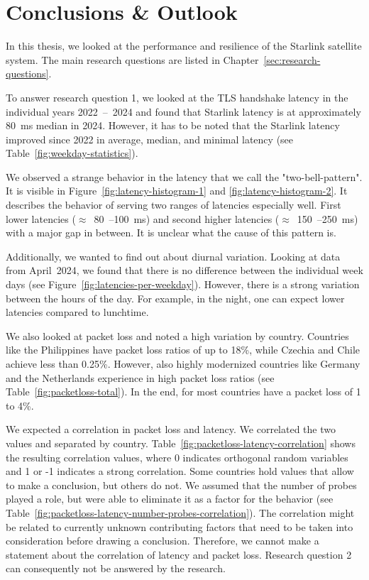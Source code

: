 \chapter{Conclusions \& Outlook} \label{sec:conclusion}

In this thesis, we looked at the performance and resilience of the Starlink
satellite system. The main research questions are listed in
Chapter~\ref{sec:research-questions}.

To answer research question 1, we looked at the TLS handshake latency in the
individual years 2022~--~2024 and found that Starlink latency is at
approximately 80~ms median in 2024. However, it has to be noted that the
Starlink latency improved since 2022 in average, median, and minimal latency
(see Table~\ref{fig:weekday-statistics}).

We observed a strange behavior in the latency that we call the
"two-bell-pattern". It is visible in Figure~\ref{fig:latency-histogram-1} and
\ref{fig:latency-histogram-2}. It describes the behavior of serving two ranges
of latencies especially well. First lower latencies ($\approx$~80~--100~ms) and
second higher latencies ($\approx$~150~--250~ms) with a major gap in between.
It is unclear what the cause of this pattern is.

Additionally, we wanted to find out about diurnal variation. Looking at data
from April~2024, we found that there is no difference between the individual
week days (see Figure~\ref{fig:latencies-per-weekday}). However, there is a
strong variation between the hours of the day. For example, in the night, one
can expect lower latencies compared to lunchtime.

We also looked at packet loss and noted a high variation by country. Countries
like the Philippines have packet loss ratios of up to 18\%, while Czechia and
Chile achieve less than 0.25\%. However, also highly modernized countries like
Germany and the Netherlands experience in high packet loss ratios (see
Table~\ref{fig:packetloss-total}). In the end, for most countries have a packet
loss of 1 to 4\%.

We expected a correlation in packet loss and latency. We correlated the two
values and separated by country. Table~\ref{fig:packetloss-latency-correlation}
shows the resulting correlation values, where 0 indicates orthogonal random
variables and 1 or -1 indicates a strong correlation. Some countries hold
values that allow to make a conclusion, but others do not. We assumed that the
number of probes played a role, but were able to eliminate it as a factor for
the behavior (see
Table~\ref{fig:packetloss-latency-number-probes-correlation}). The correlation
might be related to currently unknown contributing factors that need to be
taken into consideration before drawing a conclusion. Therefore, we cannot make
a statement about the correlation of latency and packet loss. Research question
2 can consequently not be answered by the research.

